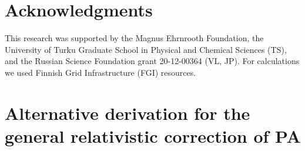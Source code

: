 \documentclass{aa}
\begin{document}
\section*{Acknowledgments}

This research was supported by the Magnus Ehrnrooth Foundation, the University of Turku Graduate School in Physical and Chemical Sciences (TS), and the Russian Science Foundation grant 20-12-00364 (VL, JP). 
For calculations we used Finnish Grid Infrastructure (FGI) resources.




\appendix

\section{Alternative derivation for the general relativistic correction of PA}
\label{sec:appendix}
 
\end{document}
